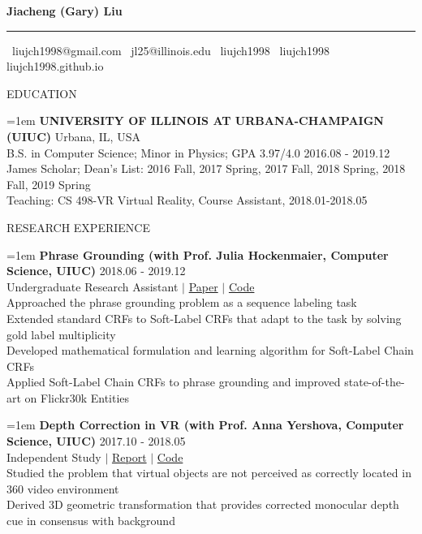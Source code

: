 \documentclass[10pt]{article}
\begin{document}
\begin{center}
    \textbf{\LARGE Jiacheng (Gary) Liu}
    \hrule
    \faEnvelope \, liujch1998@gmail.com \quad
    \faEnvelope \, jl25@illinois.edu \quad
    \faLinkedin \, liujch1998 \quad
    \faGithub \, liujch1998 \quad
    \faGithubAlt \, liujch1998.github.io
\end{center}

\vspace{1em}
{\LARGE EDUCATION}

\hangindent=1em
\textbf{UNIVERSITY OF ILLINOIS AT URBANA-CHAMPAIGN (UIUC)} \hfill Urbana, IL, USA \\
B.S. in Computer Science; Minor in Physics; GPA 3.97/4.0 \hfill 2016.08 - 2019.12 \\
James Scholar; Dean's List: 2016 Fall, 2017 Spring, 2017 Fall, 2018 Spring, 2018 Fall, 2019 Spring \\
Teaching: CS 498-VR Virtual Reality, Course Assistant, 2018.01-2018.05

\vspace{1em}
{\LARGE RESEARCH EXPERIENCE}

\hangindent=1em
\textbf{Phrase Grounding (with Prof. Julia Hockenmaier, Computer Science, UIUC)} \hfill 2018.06 - 2019.12 \\
Undergraduate Research Assistant $|$ \href{https://arxiv.org/abs/1909.00301}{Paper} $|$ \href{https://github.com/liujch1998/SoftLabelCCRF}{Code} \\
Approached the phrase grounding problem as a sequence labeling task \\
Extended standard CRFs to Soft-Label CRFs that adapt to the task by solving gold label multiplicity \\
Developed mathematical formulation and learning algorithm for Soft-Label Chain CRFs \\
Applied Soft-Label Chain CRFs to phrase grounding and improved state-of-the-art on Flickr30k Entities

\hangindent=1em
\textbf{Depth Correction in VR (with Prof. Anna Yershova, Computer Science, UIUC)} \hfill 2017.10 - 2018.05 \\
Independent Study $|$ \href{https://github.com/liujch1998/Lab/blob/master/vr-360-depth-correction/report/report.pdf}{Report} $|$ \href{https://github.com/liujch1998/Lab/tree/master/vr-360-depth-correction}{Code} \\
Studied the problem that virtual objects are not perceived as correctly located in 360 video environment \\
Derived 3D geometric transformation that provides corrected monocular depth cue in consensus with background
\end{document}
